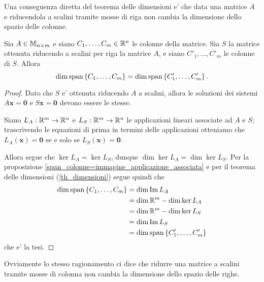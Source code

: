 Una conseguenza diretta del teorema delle dimensioni e' che data una matrice $A$ e riducendola a scalini tramite mosse di riga non cambia la dimensione dello spazio delle colonne.
\begin{proposition}\label{invarianza_dim_colonne_per_mosse_riga}
    Sia $A \in \mathbb{M}_{n\times m}$ e siano $C_1, \dots, C_m \in \mathbb{R}^n$ le colonne della matrice. Sia $S$ la matrice ottenuta riducendo a scalini per riga la matrice $A$, e siano $C'_1, \dots, C'_m$ le colonne di $S$. Allora \begin{equation}
        \dim \operatorname{span}\left\{C_1, \dots, C_m\right\} = \dim \operatorname{span}\left\{C'_1, \dots, C'_m\right\}.
    \end{equation}
\end{proposition}
\begin{proof}
    Dato che $S$ e' ottenuta riducendo $A$ a scalini, allora le soluzioni dei sistemi $A\bm{x} = \bm 0$ e $S\bm{x} = \bm 0$ devono essere le stesse. 
    
    Siano $L_A : \mathbb{R}^m \to \mathbb{R}^n$ e $L_S : \mathbb{R}^m \to \mathbb{R}^n$ le applicazioni lineari associate ad $A$ e $S$; trascrivendo le equazioni di prima in termini delle applicazioni otteniamo che $L_A(\bm x) = \bm 0$ se e solo se $L_S(\bm x) = \bm 0$. 
    
    Allora segue che $\ker L_A = \ker L_S$, dunque $\dim \ker L_A = \dim \ker L_S$. Per la proposizione \ref{span_colonne=immagine_applicazione_associata} e per il teorema delle dimensioni (\ref{th_dimensioni}) segue quindi che
    \begin{alignat*}
        {1}
        \dim \operatorname{span}\left\{C_1, \dots, C_m\right\} &= \dim \operatorname{Im}L_A\\
        &= \dim \mathbb{R}^m - \dim \ker L_A\\
        &= \dim \mathbb{R}^m - \dim \ker L_S\\
        &= \dim \operatorname{Im}L_S \\
        &= \dim \operatorname{span}\left\{C'_1, \dots, C'_m\right\}
    \end{alignat*}
    che e' la tesi.
\end{proof}

Ovviamente lo stesso ragionamento ci dice che ridurre una matrice a scalini tramite mosse di colonna non cambia la dimensione dello spazio delle righe.

